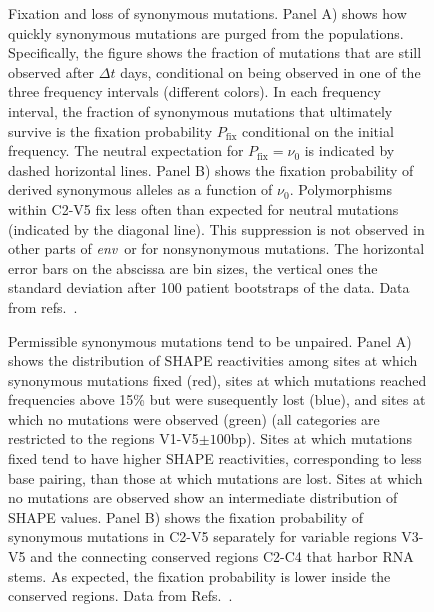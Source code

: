 \documentclass[10pt]{article}
\newcommand{\pfix}{P_{\mathrm{fix}}}
\newcommand{\env}{\textit{env}}
\newcommand{\shankaregion}{C2-V5}
\begin{document}
\begin{figure}[!ht]
\begin{center}
\caption{Fixation and loss of synonymous mutations.
Panel A) shows how quickly synonymous mutations are purged from the populations. 
Specifically, the figure shows the fraction of mutations that are still observed
after $\Delta t$ days, conditional on being observed in one of the three frequency 
intervals (different colors). 
In each frequency interval, the fraction of synonymous
mutations that ultimately survive is the fixation probability $\pfix$ conditional on the
initial frequency. The neutral expectation for $\pfix=\nu_0$ is indicated by 
dashed horizontal lines.
Panel B) shows the fixation probability of derived synonymous
alleles as a function of $\nu_0$. Polymorphisms within \shankaregion{} fix less
often than expected for neutral mutations (indicated by the diagonal line).
This suppression is not observed in other parts of \env~or for nonsynonymous mutations.
The horizontal error bars on the abscissa are bin sizes, the vertical ones the
standard deviation after 100 patient bootstraps of the data. Data from
refs.~\cite{shankarappa_consistent_1999,liu_selection_2006, bunnik_autologous_2008}.}
\label{fig:fixp}
\end{center}
\end{figure}

\begin{figure}[!ht]
\begin{center}
\caption{Permissible synonymous mutations tend to be unpaired.
Panel A) shows the distribution of SHAPE reactivities among sites at which synonymous 
mutations fixed (red), sites at which mutations reached frequencies above 15\% but
were susequently lost (blue), and sites at which no mutations were observed (green) 
(all categories are restricted to the regions V1-V5$\pm 100$bp).
Sites at which mutations fixed tend to have higher SHAPE reactivities, corresponding to
less base pairing, than those at which mutations are lost.
Sites at which no mutations are observed show an intermediate distribution of SHAPE values.
Panel B) shows the fixation probability of synonymous mutations in
\shankaregion{} separately for variable regions V3-V5 and the connecting conserved 
regions C2-C4 that harbor RNA stems. As expected, the fixation probability is lower
inside the conserved regions. Data from Refs.~\cite{shankarappa_consistent_1999,
bunnik_autologous_2008, liu_selection_2006}.}
\label{fig:SHAPE}
\end{center}
\end{figure}
\end{document}
